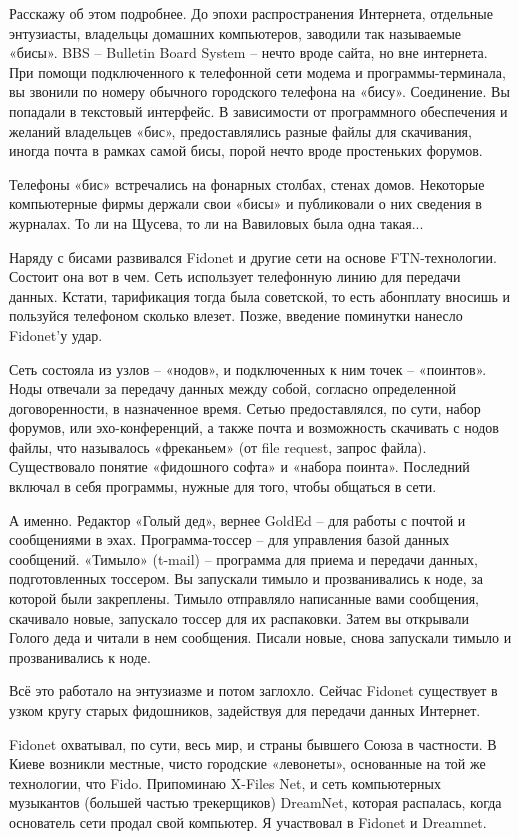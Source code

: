\newpage

Расскажу об этом подробнее. До эпохи распространения Интернета, отдельные энтузиасты, владельцы домашних компьютеров, заводили так называемые «бисы». BBS – Bulletin Board System – нечто вроде сайта, но вне интернета. При помощи подключенного к телефонной сети модема и программы-терминала, вы звонили по номеру обычного городского телефона на «бису». Соединение. Вы попадали в текстовый интерфейс. В зависимости от программного обеспечения и желаний владельцев «бис», предоставлялись разные файлы для скачивания, иногда почта в рамках самой бисы, порой нечто вроде простеньких форумов. 

Телефоны «бис» встречались на фонарных столбах, стенах домов. Некоторые компьютерные фирмы держали свои «бисы» и публиковали о них сведения в журналах. То ли на Щусева, то ли на Вавиловых была одна такая...
 
Наряду с бисами развивался Fidonet и другие сети на основе FTN-технологии. Состоит она вот в чем. Сеть использует телефонную линию для передачи данных. Кстати, тарификация тогда была советской, то есть абонплату вносишь и пользуйся телефоном сколько влезет. Позже, введение поминутки нанесло Fidonet'у удар.

Сеть состояла из узлов – «нодов», и подключенных к ним точек – «поинтов». Ноды отвечали за передачу данных между собой, согласно определенной договоренности, в назначенное время. Сетью предоставлялся, по сути, набор форумов, или эхо-конференций, а также почта и возможность скачивать с нодов файлы, что называлось «фреканьем» (от file request, запрос файла). Существовало понятие «фидошного софта» и «набора поинта». Последний включал в себя программы, нужные для того, чтобы общаться в сети.

А именно. Редактор «Голый дед», вернее GoldEd – для работы с почтой и сообщениями в эхах. Программа-тоссер – для управления базой данных сообщений. «Тимыло» (t-mail) – программа для приема и передачи данных, подготовленных тоссером. Вы запускали тимыло и прозванивались к ноде, за которой были закреплены. Тимыло отправляло написанные вами сообщения, скачивало новые, запускало тоссер для их распаковки. Затем вы открывали Голого деда и читали в нем сообщения. Писали  новые, снова запускали тимыло и прозванивались к ноде. 

Всё это работало на энтузиазме и потом заглохло. Сейчас Fidonet существует в узком кругу старых фидошников, задействуя для передачи данных Интернет.

Fidonet охватывал, по сути, весь мир, и страны бывшего Союза в частности. В Киеве возникли местные, чисто городские «левонеты», основанные на той же технологии, что Fido. Припоминаю X-Files Net, и сеть компьютерных музыкантов (большей частью трекерщиков) DreamNet, которая распалась, когда основатель сети продал свой компьютер. Я участвовал в Fidonet и Dreamnet.

